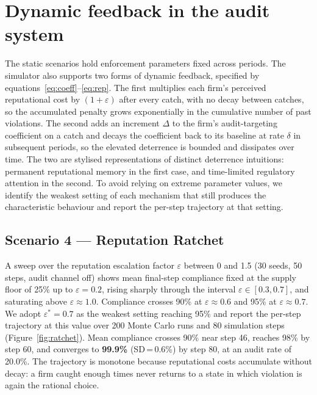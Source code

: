 \section{Dynamic feedback in the audit system}
\label{sec:results-dynamic}

The static scenarios hold enforcement parameters fixed across periods.
The simulator also supports two forms of dynamic feedback, specified
by equations~\eqref{eq:coeff}--\eqref{eq:rep}. The first multiplies
each firm's perceived reputational cost by $(1 + \varepsilon)$ after
every catch, with no decay between catches, so the accumulated
penalty grows exponentially in the cumulative number of past
violations. The second adds an increment $\Delta$ to the firm's
audit-targeting coefficient on a catch and decays the coefficient
back to its baseline at rate $\delta$ in subsequent periods, so the
elevated deterrence is bounded and dissipates over time. The two are
stylised representations of distinct deterrence intuitions: permanent
reputational memory in the first case, and time-limited regulatory
attention in the second. To avoid relying on extreme parameter values,
we identify the weakest setting of each mechanism that still produces
the characteristic behaviour and report the per-step trajectory at
that setting.

\subsection{Scenario 4 --- Reputation Ratchet}

A sweep over the reputation escalation factor $\varepsilon$ between
0 and 1.5 (30 seeds, 50 steps, audit channel off) shows mean
final-step compliance fixed at the supply floor of 25\% up to
$\varepsilon = 0.2$, rising sharply through the interval
$\varepsilon \in [0.3, 0.7]$, and saturating above
$\varepsilon \approx 1.0$. Compliance crosses 90\% at
$\varepsilon \approx 0.6$ and 95\% at $\varepsilon \approx 0.7$.
We adopt $\varepsilon^* = 0.7$ as the weakest setting reaching 95\%
and report the per-step trajectory at this value over 200 Monte
Carlo runs and 80 simulation steps (Figure~\ref{fig:ratchet}). Mean
compliance crosses 90\% near step 46, reaches 98\% by step 60, and
converges to \textbf{99.9\%} (SD\,=\,0.6\%) by step 80, at an audit
rate of 20.0\%. The trajectory is monotone because reputational
costs accumulate without decay: a firm caught enough times never
returns to a state in which violation is again the rational choice.

